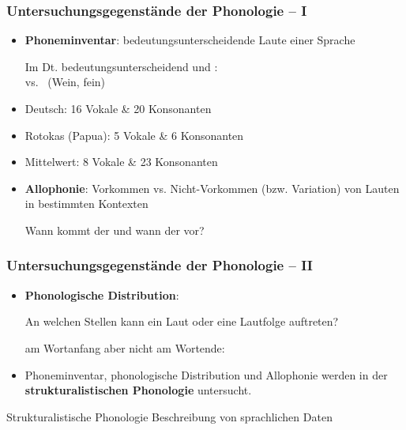 \begin{frame}
\frametitle{Untersuchungsgegenstände der Phonologie -- I}
	
	\begin{itemize}
		\item \textbf{Phoneminventar}: bedeutungsunterscheidende Laute einer Sprache 

		\ea Im Dt. bedeutungsunterscheidend \textipa{[v]} und \textipa{[f]}: \\
		\textipa{[v\t{aI}n]} vs.\ \textipa{[f\t{aI}n]} (Wein, fein)
	\z
	
		\item Deutsch: 16 Vokale \& 20 Konsonanten
		\item Rotokas (Papua): 5 Vokale \& 6 Konsonanten
		\item Mittelwert:  8 Vokale \& 23 Konsonanten
	
		\item \textbf{Allophonie}: Vorkommen vs. Nicht-Vorkommen (bzw. Variation) von Lauten in bestimmten Kontexten

		\ea Wann kommt der  und wann der  vor?
		\z

\end{itemize}

\end{frame}


\begin{frame}
\frametitle{Untersuchungsgegenstände der Phonologie -- II}

\begin{itemize}

		\item \textbf{Phonologische Distribution}:\par
		An welchen Stellen kann ein Laut oder eine Lautfolge auftreten?

	\ea \textipa{[St\textscr]} am Wortanfang aber nicht am Wortende:\\
	\textipa{[St{\textscr}\t{aU}x]} \vs *
	\z
	
	\item Phoneminventar, phonologische Distribution und Allophonie werden in der \textbf{strukturalistischen Phonologie} untersucht.

\end{itemize}

\begin{block}{Strukturalistische Phonologie}
	Beschreibung von sprachlichen Daten 
\end{block}

\end{frame}


